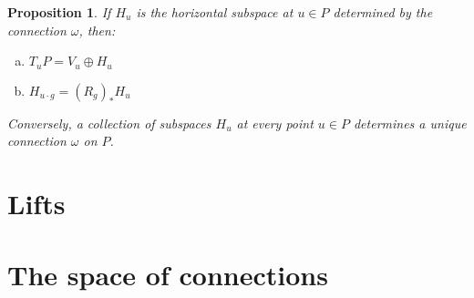 \documentclass{book}
\theoremstyle{plain}
\newtheorem{prop}[thm]{Proposition}
\theoremstyle{definition}
\theoremstyle{remark}
\begin{document}
\begin{prop}
    If $H_u$ is the horizontal subspace at $u\in P$ determined by the connection $\omega$, then:
    \begin{enumerate} [(a)]
        \item $T_uP = V_u \oplus H_u$
        \item $H_{u\cdot g} = (R_g)_* H_u$
    \end{enumerate}
    Conversely, a collection of subspaces $H_u$ at every point $u\in P$ determines a unique connection $\omega$ on $P$.
\end{prop}

\section{Lifts}
\section{The space of connections}
\end{document}
